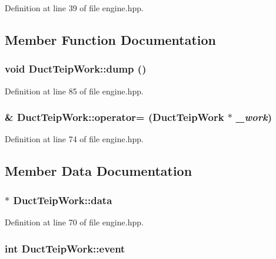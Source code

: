 Definition at line 39 of file engine.hpp.

\subsection{Member Function Documentation}
\hypertarget{struct_duct_teip_work_a41d09a43c0fbe49dd8474799fcbd921f}{
\subsubsection[{dump}]{\setlength{\rightskip}{0pt plus 5cm}void DuctTeipWork::dump ()}}
\label{struct_duct_teip_work_a41d09a43c0fbe49dd8474799fcbd921f}


Definition at line 85 of file engine.hpp.\hypertarget{struct_duct_teip_work_a0a122f349e8c0f2815ca0c124873e60c}{
\subsubsection[{operator=}]{\& DuctTeipWork::operator= ({\bf DuctTeipWork} $\ast$ {\em \_\-work})}}
\label{struct_duct_teip_work_a0a122f349e8c0f2815ca0c124873e60c}


Definition at line 74 of file engine.hpp.

\subsection{Member Data Documentation}
\hypertarget{struct_duct_teip_work_acdf66c310bbcc27117537420a1ea493c}{
\subsubsection[{data}]{$\ast$ {\bf DuctTeipWork::data}}}
\label{struct_duct_teip_work_acdf66c310bbcc27117537420a1ea493c}


Definition at line 70 of file engine.hpp.\hypertarget{struct_duct_teip_work_abbdc5253040e588d4afdcf6a7b6760ea}{
\subsubsection[{event}]{\setlength{\rightskip}{0pt plus 5cm}int {\bf DuctTeipWork::event}}}
\label{struct_duct_teip_work_abbdc5253040e588d4afdcf6a7b6760ea}



